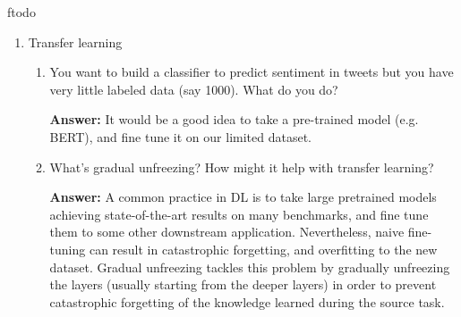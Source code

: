 ƒtodo\documentclass{article}
\newenvironment{QandA}{\begin{enumerate}[label=\arabic*.]}{\end{enumerate}}
\newenvironment{InnerQandA}{\begin{enumerate}[label=\roman*.]}{\end{enumerate}}
\newenvironment{answer}{\par\normalfont \textbf{Answer:}}{}
\begin{document}
\begin{QandA}
\begin{InnerQandA}
        \item How would changing the number of heads in multi-headed attention affect the model’s performance?
        \begin{answer}
            As we discussed in the previous question, it is of crucial importance to use more than one head, as it increases the expressivity of the Transformer. \\\\
            However, setting too many heads might cause duplication of information, overfitting, and entanglement of sentence structures.  \\\\
            Nevertheless, this is a hyperparameter that can be searched over -- the authors of the paper ``Attention is All You Need'' found that using 8 heads was optimal for the problem of machine translation. 
        \end{answer}
    \end{InnerQandA}

    \item Transfer learning
    \begin{InnerQandA}
        \item You want to build a classifier to predict sentiment in tweets but you have very little labeled data (say 1000). What do you do?
        \begin{answer}
            It would be a good idea to take a pre-trained model (e.g. BERT), and fine tune it on our limited dataset.
        \end{answer}

        \item What’s gradual unfreezing? How might it help with transfer learning?
        \begin{answer}
            A common practice in DL is to take large pretrained models achieving state-of-the-art results on many benchmarks, and fine tune them to some other downstream application. Nevertheless, naive fine-tuning can result in catastrophic forgetting, and overfitting to the new dataset. Gradual unfreezing tackles this problem by gradually unfreezing the layers (usually starting from the deeper layers) in order to prevent catastrophic forgetting of the knowledge learned during the source task.
        \end{answer}
    \end{InnerQandA}


\end{QandA}
\end{document}

